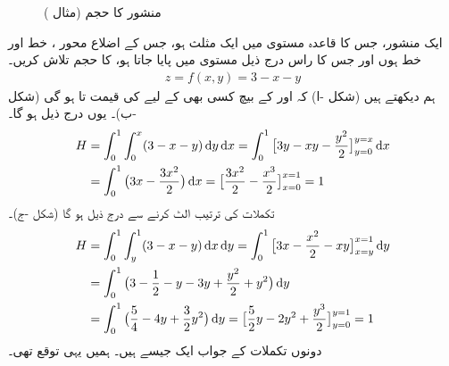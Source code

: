 \begin{figure}
\begin{subfigure}{0.25\textwidth}
\caption{}
\end{subfigure}\hfill
\begin{subfigure}{0.25\textwidth}
\centering
{}
\caption{}
\end{subfigure}
\caption{منشور کا حجم (مثال )}
\label{شکل_مثال_بالکثرت_فوبینی_مثلث}
\end{figure}

ایک منشور،  جس کا قاعدہ  مستوی  میں ایک مثلث   ہو،  جس  کے اضلاع محور ، خط  اور خط  ہوں اور جس کا راس  درج ذیل مستوی میں پایا جاتا ہو، کا حجم تلاش کریں۔
\begin{align*}
z=f(x,y)=3-x-y
\end{align*}
ہم دیکھتے ہیں (شکل -ا)  کہ   اور    کے بیچ  کسی بھی   کے لیے  کی قیمت  تا  ہو گی (شکل -ب)۔ یوں درج ذیل ہو گا۔
\begin{align*}
H&=\int_0^1\int_0^x(3-x-y)\dif y\dif x=\int_0^1\big[3y-xy-\frac{y^2}{2}\big]_{y=0}^{y=x}\dif x\\
&=\int_0^1\big(3x-\frac{3x^2}{2}\big)\dif x=\big[\frac{3x^2}{2}-\frac{x^3}{2}\big]_{x=0}^{x=1}=1
\end{align*}
تکملات  کی ترتیب الٹ کرنے سے درج ذیل  ہو گا (شکل -ج)۔
\begin{align*}
H&=\int_0^1\int_y^1(3-x-y)\dif x\dif y=\int_0^1\big[3x-\frac{x^2}{2}-xy\big]_{x=y}^{x=1}\dif y\\
&=\int_0^1\big(3-\frac{1}{2}-y-3y+\frac{y^2}{2}+y^2\big)\dif y\\
&=\int_0^1\big(\frac{5}{4}-4y+\frac{3}{2}y^2\big)\dif y=\big[\frac{5}{2}y-2y^2+\frac{y^3}{2}\big]_{y=0}^{y=1}=1
\end{align*}
دونوں تکملات کے جواب ایک جیسے ہیں۔ ہمیں  یہی توقع تھی۔

